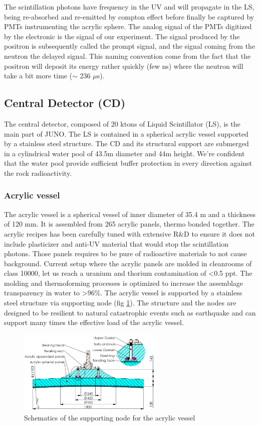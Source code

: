 \documentclass[../main.tex]{subfiles}
\begin{document}
The scintillation photons have frequency in the UV and will propagate in the LS, being re-absorbed and re-emitted by compton effect before finally be captured by PMTs instrumenting the acrylic sphere. The analog signal of the PMTs digitized by the electronic is the signal of our experiment. The signal produced by the positron is subsequently called the prompt signal, and the signal coming from the neutron the delayed signal. This naming convention come from the fact that the positron will deposit its energy rather quickly (few ns) where the neutron will take a bit more time ($\sim$ 236 $\mu$s).

\subsection{Central Detector (CD)}
\label{sec:juno:CD}

The central detector, composed of 20 ktons of Liquid Scintillator (LS), is the main part of JUNO. The LS is contained in a spherical acrylic vessel supported by a stainless steel structure. The CD and its structural support are submerged in a cylindrical water pool of 43.5m diameter and 44m height. We're confident that the water pool provide sufficient buffer protection in every direction against the rock radioactivity.
\subsubsection{Acrylic vessel}
The acrylic vessel is a spherical vessel of inner diameter of 35.4 m and a thickness of 120 mm. It is assembled from 265 acrylic panels, thermo bonded together. The acrylic recipes has been carefully tuned with extensive R\&D to ensure it does not include plasticizer and anti-UV material that would stop the scintillation photons.
Those panels requires to be pure of radioactive materials to not cause background. Current setup where the acrylic panels are molded in cleanrooms of class 10000, let us reach a uranium and thorium contamination of <0.5 ppt. The molding and thermoforming processes is optimized to increase the assemblage transparency in water to >96\%. The acrylic vessel is supported by a stainless steel structure via supporting node (fig \ref{fig:juno:sup_node}). The structure and the nodes are designed to be resilient to natural catastrophic events such as earthquake and can support many times the effective load of the acrylic vessel.

\begin{figure}[ht]
  \centering
  \includegraphics[height=4cm]{images/juno/node_b.png}
  \caption{Schematics of the supporting node for the acrylic vessel}
  \label{fig:juno:sup_node}
\end{figure}
\end{document}
